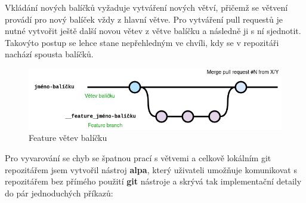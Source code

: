 \documentclass[
  digital,     %
  oneside,     %
  nosansbold,  %
  nocolorbold, %
  lof,         %
  lot,         %
]{fithesis4}
\begin{document}
Vkládání nových balíčků vyžaduje vytváření nových větví, přičemž
se větvení provádí pro nový balíček vždy z hlavní větve. Pro
vytváření pull requestů je nutné vytvořit ještě další novou
větev z větve balíčku a následně ji s ní sjednotit. Takovýto
postup se lehce stane nepřehledným ve chvíli, kdy se v repozitáři
nachází spousta balíčků.

\begin{figure}[H]
    \begin{center}
      \includegraphics[width=1\textwidth]{images/png/feature_branch.png}
    \end{center}
    \caption{Feature větev balíčku}
    \label{fig:feature_branch}
\end{figure}

Pro vyvarování se chyb se špatnou prací s větvemi a celkově
lokálním git repozitářem jsem vytvořil nástroj \textbf{alpa},
který uživateli umožňuje komunikovat s repozitářem bez přímého
použití \textbf{git} nástroje a skrývá tak implementační detaily 
do pár jednoduchých příkazů:
\end{document}
